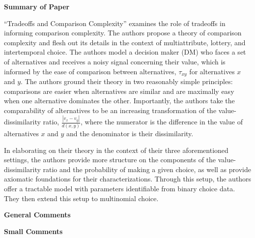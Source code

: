 \documentclass[12pt]{article}
\author{Dylan Baker}
\begin{document}
\textbf{Summary of Paper}

``Tradeoffs and Comparison Complexity''
examines the role of tradeoffs 
in informing comparison complexity.
The authors propose
a theory of comparison complexity 
and flesh out its details
in the context of 
multiattribute, lottery, and intertemporal choice.
The authors model 
a decision maker (DM) who faces a set of alternatives 
and receives a noisy signal concerning their 
value, which is informed by the ease of comparison
between alternatives, $\tau_{xy}$ for 
alternatives $x$ and $y$.
The authors ground their theory in two 
reasonably simple principles: 
comparisons are easier when alternatives are similar
and are maximally easy when one alternative dominates the other.
Importantly, the authors take 
the comparability of alternatives to be 
an increasing transformation of the 
value-dissimilarity ratio,
$\frac{\left|v_x-v_y\right|}{d(x, y)}$, where 
the numerator is the difference in the 
value of alternatives $x$ and $y$
and the denominator is their dissimilarity.

In elaborating on their theory in the context of 
their three aforementioned settings,
the authors provide more structure on 
the components of the value-dissimilarity ratio 
and the probability 
of making a given choice, as well as provide 
axiomatic foundations for their characterizations.
Through this setup, the authors offer 
a tractable model with parameters 
identifiable from binary choice data.
They then extend this setup to 
multinomial choice.



\textbf{General Comments}



\textbf{Small Comments}
\end{document}
